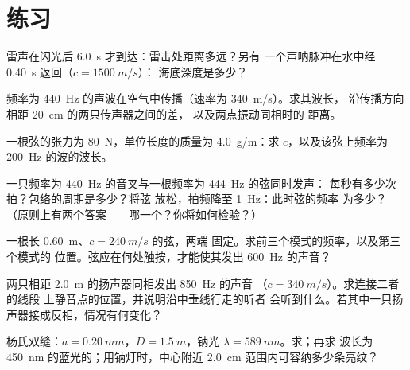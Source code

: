 \section{练习}

\begin{exercise}[$\star$]\label{exo:b1:wave-propagation:1}
雷声在闪光后 \qty{6.0}{s} 才到达：雷击处距离多远？另有
一个声呐脉冲在水中经 \qty{0.40}{s} 返回（$c = \qty{1500}{m/s}$）：
海底深度是多少？
\end{exercise}

\begin{exercise}[$\star$]\label{exo:b1:wave-propagation:2}
频率为 \qty{440}{Hz} 的声波在空气中传播（速率为 \qty{340}{m/s}）。求其波长，
沿传播方向相距 \qty{20}{cm} 的两只传声器之间的差，
以及两点振动同相时的
距离。
\end{exercise}

\begin{exercise}[$\star$]\label{exo:b1:wave-propagation:3}
一根弦的张力为 \qty{80}{N}，单位长度的质量为
\qty{4.0}{g/m}：求 $c$，以及该弦上频率为 \qty{200}{Hz}
的波的波长。
\end{exercise}

\begin{exercise}[$\star$]\label{exo:b1:wave-propagation:4}
一只频率为 \qty{440}{Hz} 的音叉与一根频率为 \qty{444}{Hz} 的弦同时发声：
每秒有多少次拍？包络的周期是多少？将弦
放松，拍频降至 \qty{1}{Hz}：此时弦的频率
为多少？（原则上有两个答案——哪一个？你将如何检验？）
\end{exercise}

\begin{exercise}[$\star\star$]\label{exo:b1:wave-propagation:5}
一根长 \qty{0.60}{m}、$c = \qty{240}{m/s}$ 的弦，两端
固定。求前三个模式的频率，以及第三个模式的
位置。弦应在何处触按，才能使其发出
\qty{600}{Hz} 的声音？
\end{exercise}

\begin{exercise}[$\star\star$]\label{exo:b1:wave-propagation:6}
两只相距 \qty{2.0}{m} 的扬声器同相发出 \qty{850}{Hz} 的声音
（$c = \qty{340}{m/s}$）。求连接二者的线段
上静音点的位置，并说明沿中垂线行走的听者
会听到什么。若其中一只扬声器接成反相，情况有何变化？
\end{exercise}

\begin{exercise}[$\star\star$]\label{exo:b1:wave-propagation:7}
杨氏双缝：$a = \qty{0.20}{mm}$，$D = \qty{1.5}{m}$，钠光
$\lambda = \qty{589}{nm}$。求；再求
波长为 \qty{450}{nm} 的蓝光的；用钠灯时，中心附近
\qty{2.0}{cm} 范围内可容纳多少条亮纹？
\end{exercise}

